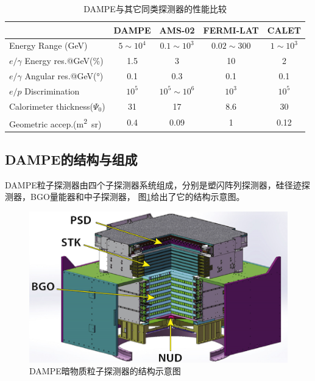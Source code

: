 \begin{table}[htb]
	\centering
	\caption{DAMPE与其它同类探测器的性能比较}
	\label{tab:introduction:dampe_comparison}
	\begin{threeparttable}
	\begin{tabulary}{\linewidth}{LCCCC}
		\toprule[1.5pt]
		  & DAMPE & AMS-02 & FERMI-LAT & CALET \\ 
		\midrule[1pt]
		Energy Range (\si{GeV}) & $5\sim10^4$ & $0.1\sim10^3$ & $0.02\sim300$ & $1\sim10^3$ \\ 
		$e/\gamma$ Energy res.@\si{GeV}(\si{\percent}) & 1.5 & 3 & 10 & 2 \\ 
		$e/\gamma$ Angular res.@\si{GeV}(\si{\degree}) & 0.1 & 0.3 & 0.1 & 0.1 \\ 
		$e/p$ Discrimination& $10^5$ & $10^5\sim10^6$ & $10^3$ & $10^5$ \\ 
		Calorimeter thickness($\Psi_0$) & 31 & 17 & 8.6 & 30 \\ 
		Geometric accep.(\si{\meter\squared\steradian}) & 0.4 & 0.09 & 1 & 0.12 \\ 
		\bottomrule[1.5pt] 
	\end{tabulary}
	\end{threeparttable}
\end{table}

\subsection{DAMPE的结构与组成}
DAMPE粒子探测器由四个子探测器系统组成，分别是塑闪阵列探测器，硅径迹探测器，BGO量能器和中子探测器，
图\ref{fig:introduction:dampe_structure}给出了它的结构示意图。
\begin{figure}[htb]
	\centering
	\includegraphics[width=0.8\linewidth]{chap/introduction/fig/dampe_structure}
	\caption{DAMPE暗物质粒子探测器的结构示意图}
	\label{fig:introduction:dampe_structure}
\end{figure}


